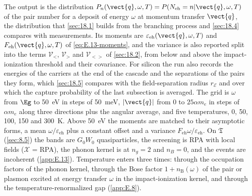 The output is the distribution $P_n(\vect{q}, \omega, T) = P(N_{\mathrm{eh}} = n|\vect{q}, \omega, T)$ of the pair number for a deposit of energy $\omega$ at momentum transfer $\vect{q}$, the distribution that \cref{sec:18.1} builds from the branching process and \cref{sec:18.4} compares with measurements. Its moments are $\varepsilon_{\mathrm{eh}}(\vect{q}, \omega, T)$ and $F_{\mathrm{eh}}(\vect{q}, \omega, T)$ of \cref{eq:E.13-moments}, and the variance is also reported split into the terms $\mathcal{V}_<$, $\mathcal{V}_>$ and $\mathcal{V}_{<>}$ of \cref{sec:18.2}, from below and above the impact-ionization threshold and their covariance. For silicon the run also records the energies of the carriers at the end of the cascade and the separations of the pairs they form, which \cref{sec:18.5} compares with the field-separation radius $r_{\mathcal{E}}$ and over which the capture probability of the last subsection is averaged. The grid is $\omega$ from $\Eg$ to \SI{50}{eV} in steps of \SI{50}{meV}, $|\vect{q}|$ from 0 to $25\alpha m_e$ in steps of $\alpha m_e$ along three directions plus the angular average, and five temperatures, 0, 50, 100, 150 and \SI{300}{K}. Above \SI{50}{eV} the moments are matched to their asymptotic forms, a mean $\omega/\varepsilon_{\mathrm{eh}}$ plus a constant offset and a variance $F_{\mathrm{eh}}\omega/\varepsilon_{\mathrm{eh}}$. On $\mathfrak{T}$ (\cref{sec:8.5}) the bands are $G_0W_0$ quasiparticles, the screening is RPA with local fields ($\mathcal{X}$ = RPA), the phonon kernel is at $n_g = 2$ and $n_B = 0$, and the events are incoherent (\cref{app:E.13}). Temperature enters three times: through the occupation factors of the phonon kernel, through the Bose factor $1 + n_{\mathrm{B}}(\omega)$ of the pair or plasmon excited at energy transfer $\omega$ in the impact-ionization kernel, and through the temperature-renormalized gap (\cref{app:E.8}).

